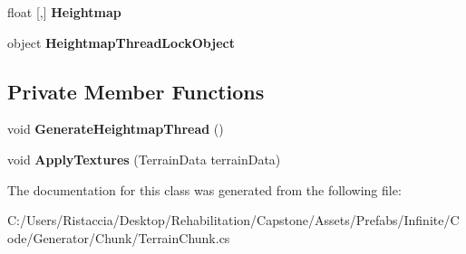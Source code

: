 \begin{DoxyCompactItemize}
\item 
\mbox{\label{class_terrain_generator_1_1_terrain_chunk_afd93b5ef83b48198113085aaa6d68b0e}} 
float \mbox{[},\mbox{]} {\bfseries Heightmap}
\item 
\mbox{\label{class_terrain_generator_1_1_terrain_chunk_a0c75287995bfa90d6188bf04ab3eb883}} 
object {\bfseries Heightmap\+Thread\+Lock\+Object}
\end{DoxyCompactItemize}
\subsection*{Private Member Functions}
\begin{DoxyCompactItemize}
\item 
\mbox{\label{class_terrain_generator_1_1_terrain_chunk_a3b8a86db36666eb33a754ca07fd25953}} 
void {\bfseries Generate\+Heightmap\+Thread} ()
\item 
\mbox{\label{class_terrain_generator_1_1_terrain_chunk_af4affa4fb264f7dbfbbbb620364d5011}} 
void {\bfseries Apply\+Textures} (Terrain\+Data terrain\+Data)
\end{DoxyCompactItemize}


The documentation for this class was generated from the following file\+:\begin{DoxyCompactItemize}
\item 
C\+:/\+Users/\+Ristaccia/\+Desktop/\+Rehabilitation/\+Capstone/\+Assets/\+Prefabs/\+Infinite/\+Code/\+Generator/\+Chunk/Terrain\+Chunk.\+cs\end{DoxyCompactItemize}

